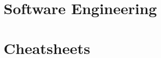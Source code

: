 \documentclass[12pt,twoside]{book}
\begin{document}
\part{Software Engineering}


\part{Cheatsheets}

\nocite{*} %
\printbibliography %
\end{document}
